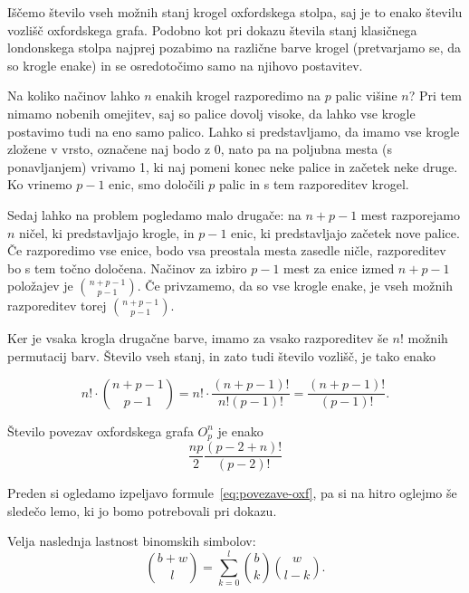 \documentclass[twoside,11pt]{article}
\begin{document}
\begin{dokaz}
Iščemo število vseh možnih stanj krogel oxfordskega stolpa, saj je to enako številu vozlišč oxfordskega grafa.
Podobno kot pri dokazu števila stanj klasičnega londonskega stolpa najprej pozabimo na različne barve krogel (pretvarjamo se, da so krogle enake) in se osredotočimo samo na njihovo postavitev. 

Na koliko načinov lahko $n$ enakih krogel razporedimo na $p$ palic višine $n$? Pri tem nimamo nobenih omejitev, saj so palice dovolj visoke, da lahko vse krogle postavimo tudi na eno samo palico. Lahko si predstavljamo, da imamo vse krogle zložene v vrsto, označene naj bodo z 0, nato pa na poljubna mesta (s ponavljanjem) vrivamo 1, ki naj pomeni konec neke palice in začetek neke druge. Ko vrinemo $p-1$ enic, smo določili $p$ palic in s tem razporeditev krogel. 

Sedaj lahko na problem pogledamo malo drugače: na $n+p-1$ mest razporejamo $n$ ničel, ki predstavljajo krogle, in $p-1$ enic, ki predstavljajo začetek nove palice. Če razporedimo vse enice, bodo vsa preostala mesta zasedle ničle, razporeditev bo s tem točno določena. Načinov za izbiro $p-1$ mest za enice izmed $n+p-1$ položajev je ${n+p-1 \choose p-1}$. Če privzamemo, da so vse krogle enake, je vseh možnih razporeditev torej ${n+p-1 \choose p-1}$.

Ker je vsaka krogla drugačne barve, imamo za vsako razporeditev še $n!$ možnih permutacij barv. Število vseh stanj, in zato tudi število vozlišč, je tako enako

\[ n! \cdot {n+p-1 \choose p-1} = n! \cdot \frac{(n+p-1)!}{n!(p-1)!} = \frac{(n+p-1)!}{(p-1)!}. \] \QED
\end{dokaz}

\begin{trditev}
    Število povezav oxfordskega grafa $O^n_p$ je enako
    \begin{equation}
    \label{eq:povezave-oxf}
    \frac{np}{2} \frac{(p-2+n)!}{(p-2)!}
    \end{equation}
    \label{trd:povezave-oxf}
\end{trditev}

Preden si ogledamo izpeljavo formule~\eqref{eq:povezave-oxf}, pa si na hitro oglejmo še sledečo lemo, ki jo bomo potrebovali pri dokazu.

\begin{lema}
    Velja naslednja lastnost binomskih simbolov:
    \begin{equation}
    \label{eq:binom}
    {b+w \choose l} = \sum_{k=0}^{l}{b \choose k}{w \choose l-k}.
    \end{equation}
\end{lema}
\end{document}
